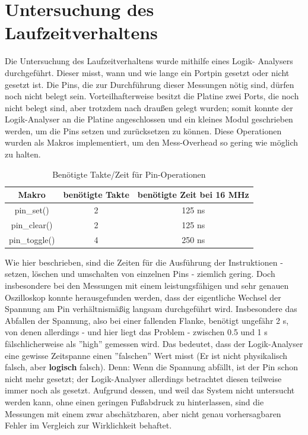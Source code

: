\chapter{Untersuchung des Laufzeitverhaltens}
Die Untersuchung des Laufzeitverhaltens wurde mithilfe eines Logik-
Analysers durchgeführt. Dieser misst, wann und wie lange
ein Portpin gesetzt oder nicht gesetzt ist. Die Pins, die zur Durchführung
dieser Messungen nötig sind, dürfen noch nicht belegt sein. Vorteilhafterweise
besitzt die Platine zwei Ports, die noch nicht belegt sind, aber
trotzdem nach draußen gelegt wurden; somit konnte der Logik-Analyser
an die Platine angeschlossen und ein kleines Modul
geschrieben werden, um die Pins setzen und zurücksetzen zu
können. Diese Operationen wurden als Makros implementiert, um den
Mess-Overhead so gering wie möglich zu halten.
\begin{table}[htb]
\begin{center}
	\begin{tabular}{|c||c|c|}
		\hline
		\textbf{Makro} & \textbf{benötigte Takte} & \textbf{benötigte Zeit bei 16 MHz} \\ \hline \hline
		pin\_set() & 2 & 125 ns \\ \hline
		pin\_clear() & 2 & 125 ns \\ \hline
		pin\_toggle() & 4 & 250 ns \\ \hline
	\end{tabular}
	\caption{\label{pin_takte} Benötigte Takte/Zeit für Pin-Operationen}
\end{center}
\end{table}
Wie hier beschrieben, sind die Zeiten für die Ausführung der Instruktionen
- setzen, löschen und umschalten von einzelnen Pins - ziemlich gering.
Doch insbesondere bei den Messungen mit einem leistungsfähigen und
sehr genauen Oszilloskop konnte herausgefunden werden, dass der eigentliche
Wechsel der Spannung am Pin verhältnismäßig langsam durchgeführt wird.
Insbesondere das Abfallen der Spannung, also bei einer fallenden Flanke,
benötigt ungefähr 2 \textmu{}s, von denen allerdings - und hier liegt das Problem - zwischen
0.5 und 1 \textmu{}s fälschlicherweise als ''high'' gemessen wird.
Das bedeutet, dass der Logik-Analyser eine gewisse Zeitspanne einen ''falschen''
Wert misst (Er ist nicht physikalisch falsch, aber \textbf{logisch} falsch).
Denn: Wenn die Spannung abfällt, ist der Pin schon nicht mehr gesetzt; der
Logik-Analyser allerdings betrachtet diesen teilweise immer noch als gesetzt.
Aufgrund dessen, und weil das System nicht untersucht
werden kann, ohne einen geringen Fußabdruck zu hinterlassen, sind die Messungen mit
einem zwar abschätzbaren, aber nicht genau vorhersagbaren Fehler im Vergleich zur
Wirklichkeit behaftet.

